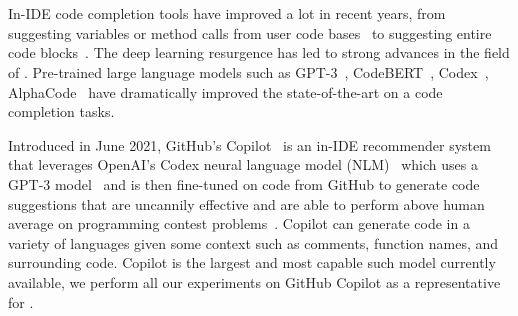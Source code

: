 \section{\cct{}}
In-IDE code completion tools have improved a lot in recent years, from suggesting variables or method calls from user code bases~\cite{mandelin2005} to suggesting entire code blocks~\cite{Ciniselli2021}. The deep learning resurgence has led to strong advances in the field of \cct{}. Pre-trained large language models such as GPT-3~\cite{Gpt3}, CodeBERT~\cite{codebert}, Codex~\cite{copilot}, AlphaCode~\cite{alphacode} have dramatically improved the state-of-the-art on a code completion tasks.

Introduced in June 2021, GitHub's Copilot~\cite{Copilot-web} is an in-IDE recommender system that leverages OpenAI's Codex neural language model (NLM)~\cite{copilot} which uses a GPT-3 model~\cite{Gpt3} and is then fine-tuned on code from GitHub to generate code suggestions that are uncannily effective and are able to perform above human average on programming contest problems~\cite{empirical_eval}. Copilot can generate code in a variety of languages given some context such as comments, function names, and surrounding code. Copilot is the largest and most capable such model currently available, we perform all our experiments on GitHub Copilot as a representative for \cct{}.